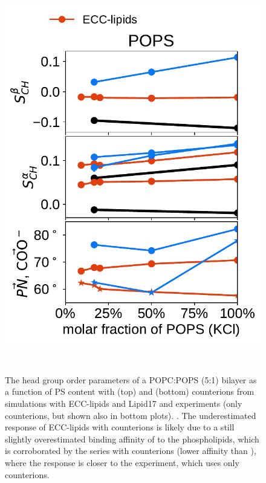 \documentclass[journal=jpcbfk,manuscript=article]{achemso}
\newlength{\figheightsmall}
\newlength{\figheight}
\begin{document}
\begin{figure}[!tbp]
  \includegraphics[height=\figheightsmall]{../Fig/order_parameters_changes_A-B_PC-PS_mix_POPS_kcl.pdf} 
  \caption{\label{fig:delta_ordPar_NaCl_PC-PS_mix} 
    The head group order parameters of a POPC:POPS (5:1) bilayer as a function of PS content
    with  (top) and  (bottom) counterions from simulations with ECC-lipids and Lipid17 \cite{lipid17-future} 
    and experiments (only  counterions, but shown also in bottom plots). \cite{roux90}. 
    The underestimated response of ECC-lipids with  counterions 
    is likely due to a still slightly overestimated binding affinity of  to the phospholipids,
    which is corroborated by the series with  counterions (lower affinity than ),
    where the response is closer to the experiment, which uses only  counterions. 
  }
   \\
\end{figure} 
\end{document}
